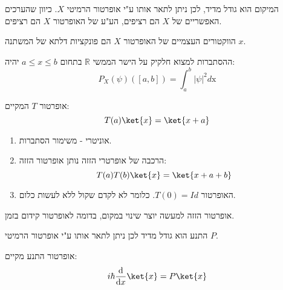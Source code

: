 \documentclass{tstextbook}
\begin{document}
\begin{definition}
המיקום הוא גודל מדיד, לכן ניתן לתאר אותו ע"י אופרטור הרמיטי \(X\). כיוון שהערכים האפשריים של \(X\) הם רציפים, הע"ע של האופרטור \(X\) הם רציפים.

\end{definition}
\begin{proposition}
הווקטורים העצמיים של האופרטור \(X\) הם פונקציות דלתא של המשתנה \(x\).

\end{proposition}
\begin{proposition}
ההסתברות למצוא חלקיק על הישר הממשי \(\mathbb{R}\) בתחום \(a\leq x \leq b\) יהיה:
$$P_{X}(\psi)([a,b])=\int_{a}^{b}|\psi|^{2}d\!\mathrm{x}$$

\end{proposition}
\begin{definition}
אופרטור \(T\) המקיים:
$$T(a)\ket{x} = \ket{x+a}$$

\end{definition}
\begin{proposition}
  \begin{enumerate}
    \item אוניטרי - משימור הסתברות.  


    \item הרכבה של אופרטרי הזזה נותן אופרטור הזזה: 
$$T(a)T(b)\ket{x}=\ket{x+a+b}  $$


    \item האופרטור \(T(0)=Id\). כלומר לא לקדם שקול ללא לעשות כלום. 


  \end{enumerate}
\end{proposition}
\begin{remark}
אופרטור הזזה למעשה יוצר שינוי במקום, בדומה לאופרטור קידום בזמן.

\end{remark}
\begin{definition}
התנע הוא גודל מדיד לכן ניתן לתאר אותו ע"י אופרטור הרמיטי \(P\).

\end{definition}
\begin{proposition}
אופרטור התנע מקיים:
$$i\hbar \frac{\mathrm{d} }{\mathrm{d} x} \ket{x} = P\ket{x} $$

\end{proposition}
\end{document}

